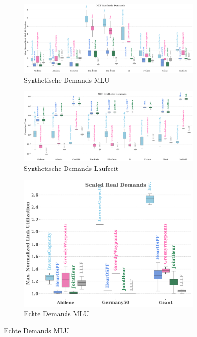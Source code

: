     \begin{figure}
        \centering
        \caption{Ergebnisse LLLF Projekt 1}
        \label{fig:ergebnisse_lllf_projekt1}
        \begin{subfigure}{1.0\textwidth}
            \centering
            \caption{Synthetische Demands MLU}
            \label{fig:ergebnisse_lllf_projekt1_1}
            \includegraphics[width=\textwidth]{Report/bilder/algorithmus1/projekt1/all_topologies_objective_0.pdf}
        \end{subfigure}
        \begin{subfigure}{1.0\textwidth}
            \centering
            \caption{Synthetische Demands Laufzeit}
            \label{fig:ergebnisse_lllf_projekt1_2}
            \includegraphics[width=\textwidth]{Report/bilder/algorithmus1/projekt1/all_topologies_execution_time_0.pdf}
        \end{subfigure}
        \begin{subfigure}{0.45\textwidth}
            \centering
            \caption{Echte Demands MLU}
            \label{fig:ergebnisse_lllf_projekt1_3}
            \includegraphics[width=\textwidth]{Report/bilder/algorithmus1/projekt1/real_demands_objective.pdf}

\end{subfigure}
\end{figure}
